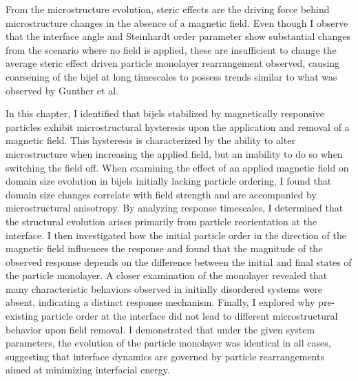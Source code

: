 From the microstructure evolution, steric effects are the
driving force behind microstructure changes in the absence of a magnetic
field. Even though I observe that the interface angle and Steinhardt
order parameter show substantial changes from the scenario where no
field is applied, these are insufficient to change the average steric
effect driven particle monolayer rearrangement observed, causing
coarsening of the bijel at long timescales to possess trends similar to what was observed by
Gunther et al. \cite{gunther_timescales_2014}


In this chapter, I identified that bijels stabilized by magnetically responsive particles exhibit microstructural hysteresis upon the application and removal of a 
magnetic field. This hysteresis is characterized by the ability to alter microstructure when increasing the applied field, but an inability to do so when switching 
the field off. When examining the effect of an applied magnetic field on domain size evolution in bijels initially lacking particle ordering, I found that domain 
size changes correlate with field strength and are accompanied by microstructural anisotropy.
By analyzing response timescales, I determined that the structural evolution arises primarily from particle reorientation at the interface. I then investigated 
how the initial particle order in the direction of the magnetic field influences the response and found that the magnitude of the observed response depends on 
the difference between the initial and final states of the particle monolayer. A closer examination of the monolayer revealed that many characteristic behaviors 
observed in initially disordered systems were absent, indicating a distinct response mechanism.
Finally, I explored why pre-existing particle order at the interface did not lead to different microstructural behavior upon field removal. I demonstrated that under 
the given system parameters, the evolution of the particle monolayer was identical in all cases, suggesting that interface dynamics are governed by particle rearrangements 
aimed at minimizing interfacial energy.